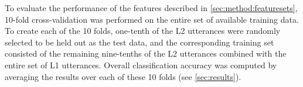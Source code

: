 \documentclass[a4paper]{article}
\begin{document}
		To evaluate the performance of the features described in \cref{sec:method:featuresets}, 10-fold cross-validation was performed on the entire set of available training data. 
		To create each of the 10 folds, one-tenth of the L2 utterances were randomly selected to be held out as the test data, and the corresponding training set consisted of the remaining nine-tenths of the L2 utterances combined with the entire set of L1 utterances. Overall classification accuracy was computed by averaging the results over each of these 10 folds (see \cref{sec:results}).
		
\end{document}
